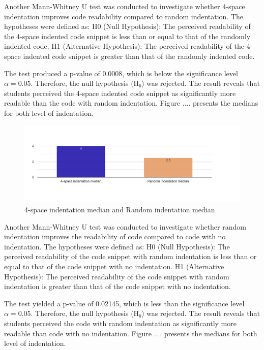 Another Mann-Whitney U test was conducted to investigate whether 4-space indentation improves code readability compared to random indentation. The hypotheses were defined as:
H0 (Null Hypothesis): The perceived readability of the 4-space indented code snippet is less than or equal to that of the randomly indented code. H1 (Alternative Hypothesis): The perceived readability of the 4-space indented code snippet is greater than that of the randomly indented code.

The test produced a p-value of 0.0008, which is below the significance level \(\alpha = 0.05\). Therefore, the null hypothesis (H₀) was rejected. The result reveals that students perceived the 4-space indented code snippet as significantly more readable than the code with random indentation. Figure .... presents the medians for both level of indentation.

\begin{figure} [H]
  \centering
  \includegraphics[scale=0.4]{figures/4-r-q5.png}
  \caption{4-space indentation median and Random indentation median}
  \label{fig:AnhangsChor}
\end{figure}


Another Mann-Whitney U test was conducted to investigate whether random indentation improves the readability of code compared to code with no indentation. The hypotheses were defined as: H0 (Null Hypothesis): The perceived readability of the code snippet with random indentation is less than or equal to that of the code snippet with no indentation.
H1 (Alternative Hypothesis): The perceived readability of the code snippet with random indentation is greater than that of the code snippet with no indentation.

The test yielded a p-value of 0.02145, which is less than the significance level \(\alpha = 0.05\). Therefore, the null hypothesis (H₀) was rejected. The result reveals that students perceived the code with random indentation  as significantly more readable than code with no indentation. Figure .... presents the medians for both level of indentation.

